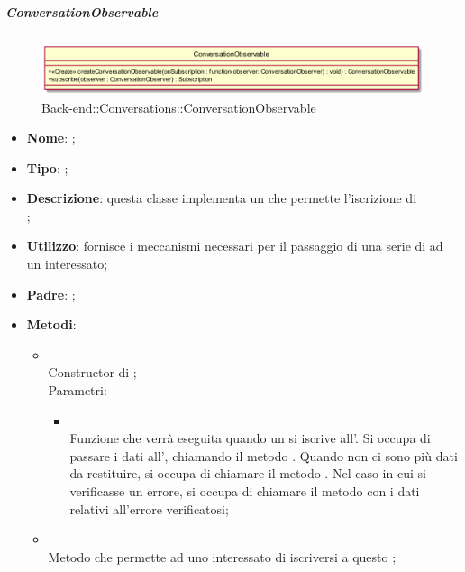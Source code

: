 \hypertarget{ConversationObservable_label}{\subparagraph{ConversationObservable}}
\begin{figure}[h]
	\centering
	\includegraphics[width=\textwidth,height=\textheight,keepaspectratio]{images/ClassConversationObservable.png}
	\caption{Back-end::Conversations::ConversationObservable}
\end{figure}
\begin{itemize}
	\item \textbf{Nome}: ;
	\item \textbf{Tipo}: ;
	\item \textbf{Descrizione}: questa classe implementa un  che permette l'iscrizione di \\ ;
	\item \textbf{Utilizzo}: fornisce i meccanismi necessari per il passaggio di una serie di  ad un  interessato;
	\item \textbf{Padre}: ;
	\item \textbf{Metodi}:
	\begin{itemize}
		\item[]  \\		Constructor di ;\\
		Parametri:
		\begin{itemize}
			\item {} \\
			Funzione che verrà eseguita quando un  si iscrive all'. Si occupa di passare i dati all', chiamando il metodo . Quando non ci sono più dati da restituire, si occupa di chiamare il metodo . Nel caso in cui si verificasse un errore, si occupa di chiamare il metodo  con i dati relativi all'errore verificatosi;
		\end{itemize}
		\item[]  \\		Metodo che permette ad uno  interessato di iscriversi a questo ;\\

\end{itemize}
\end{itemize}
